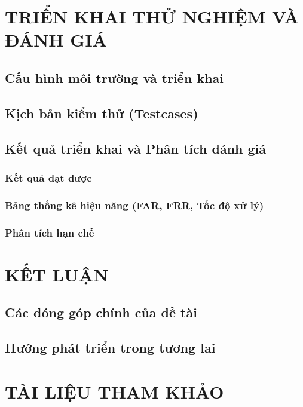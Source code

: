 \documentclass[12pt,a4paper]{report}
\begin{document}
    \chapter{TRIỂN KHAI THỬ NGHIỆM VÀ ĐÁNH GIÁ}
    \section{Cấu hình môi trường và triển khai}
    \section{Kịch bản kiểm thử (Testcases)}
    \section{Kết quả triển khai và Phân tích đánh giá}
    \subsection{Kết quả đạt được}
    \subsection{Bảng thống kê hiệu năng (FAR, FRR, Tốc độ xử lý)}
    \subsection{Phân tích hạn chế}

    \chapter{KẾT LUẬN}
    \section{Các đóng góp chính của đề tài}
    \section{Hướng phát triển trong tương lai}

    \chapter*{TÀI LIỆU THAM KHẢO}
\end{document}
